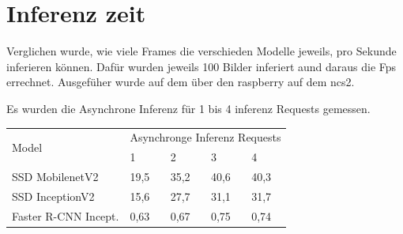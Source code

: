 






\section{Inferenz zeit}

Verglichen wurde, wie viele Frames die verschieden Modelle jeweils, 
pro Sekunde inferieren können. Dafür wurden jeweils 100 Bilder 
inferiert aund daraus die Fps errechnet. 
Ausgefüher wurde auf dem über den raspberry auf dem ncs2.

Es wurden die Asynchrone Inferenz für 1 bis 4 inferenz Requests gemessen.

\begin{table}[hpb]
  \centering
  \begin{tabular}{m{}|m{}<{\centering}|m{}<{\centering}|m{}<{\centering}|m{}<{\centering}}
  \hline
  \multirow{2}{*}{Model} & \multicolumn{4}{c}{Asynchronge Inferenz Requests} \\ \cline{2-5} 
                         & 1           & 2          & 3          & 4          \\ \hline\hline
  SSD MobilenetV2        & 19,5           & 35,2          & 40,6          & 40,3          \\
  SSD InceptionV2        & 15,6           & 27,7          & 31,1          & 31,7          \\
  Faster R-CNN Incept.   & 0,63           & 0,67          & 0,75          & 0,74          \\ \hline
  \end{tabular}
\end{table}